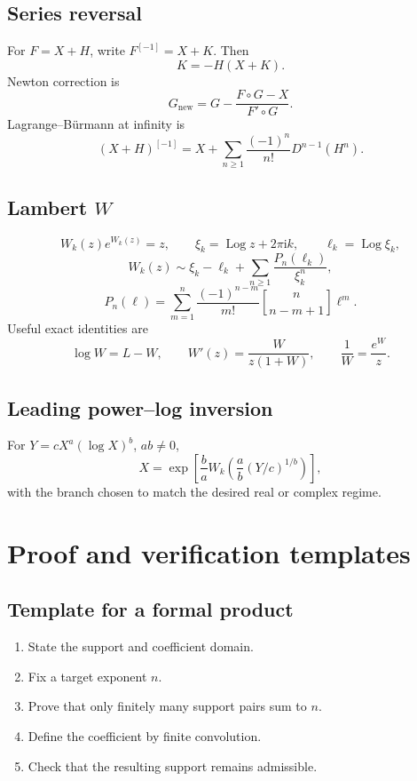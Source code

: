 \documentclass[11pt,openany]{book}
\theoremstyle{definition}
\theoremstyle{plain}
\theoremstyle{remark}
\newcommand{\ii}{\mathrm{i}}
\newcommand{\invcomp}{^{[-1]}}
\newcommand{\stirlingone}[2]{\genfrac{[}{]}{0pt}{}{#1}{#2}}
\DeclareMathOperator{\Log}{Log}
\begin{document}
\section{Series reversal}
For \(F=X+H\), write \(F\invcomp=X+K\). Then
\[
 K=-H(X+K).
\]
Newton correction is
\[
 G_{\mathrm{new}}=G-\frac{F\circ G-X}{F'\circ G}.
\]
Lagrange--B\"urmann at infinity is
\[
 (X+H)\invcomp
 =X+\sum_{n\ge1}\frac{(-1)^n}{n!}D^{n-1}(H^n).
\]

\section{Lambert \texorpdfstring{\(W\)}{W}}
\[
 W_k(z)e^{W_k(z)}=z,
 \qquad
 \xi_k=\Log z+2\pi\ii k,
 \qquad
 \ell_k=\Log\xi_k,
\]
\[
 W_k(z)\sim\xi_k-\ell_k+\sum_{n\ge1}\frac{P_n(\ell_k)}{\xi_k^n},
\]
\[
 P_n(\ell)=\sum_{m=1}^{n}
 \frac{(-1)^{n-m}}{m!}\stirlingone{n}{n-m+1}\ell^m.
\]
Useful exact identities are
\[
 \log W=L-W,
 \qquad
 W'(z)=\frac{W}{z(1+W)},
 \qquad
 \frac1W=\frac{e^W}{z}.
\]

\section{Leading power--log inversion}
For \(Y=cX^a(\log X)^b\), \(ab\ne0\),
\[
 X=
 \exp\left[
 \frac ba W_k\left(\frac ab(Y/c)^{1/b}\right)
 \right],
\]
with the branch chosen to match the desired real or complex regime.

\chapter{Proof and verification templates}\label{app:proof-templates}

\section{Template for a formal product}
\begin{enumerate}
\item State the support and coefficient domain.
\item Fix a target exponent \(n\).
\item Prove that only finitely many support pairs sum to \(n\).
\item Define the coefficient by finite convolution.
\item Check that the resulting support remains admissible.
\end{enumerate}
\end{document}
